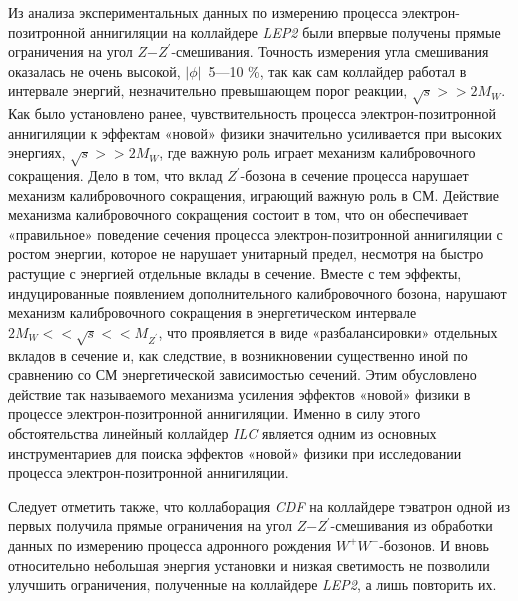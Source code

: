Из анализа экспериментальных данных по измерению процесса электрон-позитронной аннигиляции на коллайдере \textit{LEP2} были впервые получены прямые ограничения на угол $Z$−$Z^\prime$-смешивания. Точность измерения угла смешивания оказалась не очень высокой, $\left |\phi \right |$~5—10 \%, так как сам коллайдер работал в интервале энергий, незначительно превышающем порог реакции, $\sqrt{s} >> 2M_W$. Как было установлено ранее, чувствительность процесса электрон-позитронной аннигиляции к эффектам «новой» физики значительно усиливается при высоких энергиях, $\sqrt{s} >> 2M_W$, где важную роль играет механизм калибровочного сокращения. Дело в том, что вклад $Z^\prime$-бозона в сечение процесса нарушает механизм калибровочного сокращения, играющий важную роль в СМ. Действие механизма калибровочного сокращения состоит в том, что он обеспечивает «правильное» поведение сечения процесса электрон-позитронной аннигиляции с ростом энергии, которое не нарушает унитарный предел, несмотря на быстро растущие с энергией отдельные вклады в сечение. Вместе с тем эффекты, индуцированные появлением дополнительного калибровочного бозона, нарушают механизм калибровочного сокращения в энергетическом интервале $2M_W << \sqrt{s} << M_{Z^\prime}$, что проявляется в виде «разбалансировки» отдельных вкладов в сечение и, как следствие, в возникновении существенно иной по сравнению со СМ энергетической зависимостью сечений. Этим обусловлено действие так называемого механизма усиления эффектов «новой» физики в процессе электрон-позитронной аннигиляции. Именно в силу этого обстоятельства линейный коллайдер \textit{ILC} является одним из основных инструментариев для поиска эффектов «новой» физики при исследовании процесса электрон-позитронной аннигиляции.

Следует отметить также, что коллаборация \textit{CDF} на коллайдере тэватрон одной из первых получила прямые ограничения на угол $Z$−$Z^\prime$-смешивания из обработки данных по измерению процесса адронного рождения $W^+W^−$-бозонов. И вновь относительно небольшая энергия установки и низкая светимость не позволили улучшить ограничения, полученные на коллайдере \textit{LEP2}, а лишь повторить их.

